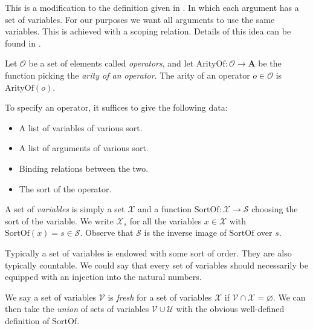\begin{remark}
    This is a modification to the definition given in \cite{harper_2016}. In which each argument has a set of variables. For our purposes we want all arguments to use the same variables. This is achieved with a scoping relation. Details of this idea can be found in \cite{nlab:initiality_project_-_raw_syntax}.
\end{remark}

\begin{defin}\label{op}
    Let $\mathcal{O}$ be a set of elements called \emph{operators}, and let $\mathrm{ArityOf} : \mathcal{O} \to \mathbf{A}$ be the function picking the \emph{arity of an operator}. The arity of an operator $o\in \mathcal{O}$ is $\mathrm{ArityOf}(o)$.
\end{defin}

\begin{remark}\label{opdata}
    To specify an operator, it suffices to give the following data:
    \begin{itemize}
        \item A list of variables of various sort.
        \item A list of arguments of various sort.
        \item Binding relations between the two.
        \item The sort of the operator.
    \end{itemize}
\end{remark}

\begin{defin}\label{variables}
    A set of \emph{variables} is simply a set $\mathcal{X}$ and a function $\mathrm{SortOf} : \mathcal{X} \to \mathcal{S}$ choosing the sort of the variable. We write $\mathcal{X}_s$ for all the variables $x \in \mathcal{X}$ with $\mathrm{SortOf}(x) = s \in \mathcal{S}$. Observe that $\mathcal{S}$ is the inverse image of $\mathrm{SortOf}$ over $s$.
\end{defin}

\begin{remark}\label{var_order}
    Typically a set of variables is endowed with some sort of order. They are also typically countable. We could say that every set of variables should necessarily be equipped with an injection into the natural numbers.
\end{remark}

\begin{defin}
    We say a set of variables $\mathcal{V}$ is \emph{fresh} for a set of variables $\mathcal{X}$ if $\mathcal{V} \cap \mathcal{X} = \varnothing$. We can then take the \emph{union} of sets of variables $\mathcal{V} \cup \mathcal{U}$ with the obvious well-defined definition of $\mathrm{SortOf}$.
\end{defin}

